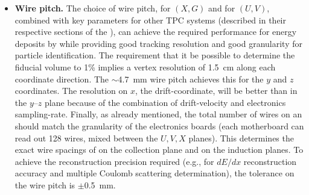 \begin{itemize}
\item \textbf{Wire pitch.} The choice of wire pitch, \xgpitch for $(X,G)$ and \uvpitch for $(U,V)$, combined with key parameters for other TPC systems (described in their respective sections of the ), can achieve the required performance for energy deposits by  while providing good tracking resolution and good granularity for particle identification. The \single requirement that it be possible to determine the fiducial volume to \num{1}\% implies a vertex resolution of \SI{1.5}{cm} along each coordinate direction. The $\sim$\SI{4.7}{mm} wire pitch achieves this for the $y$ and $z$ coordinates.  The resolution on $x$, the drift-coordinate, will be better than in the $y$--$z$ plane because of the combination of drift-velocity and electronics sampling-rate.  Finally, as already mentioned, the total number of wires on an  should match the granularity of the electronics boards (each  motherboard can read out \num{128} wires, mixed between the $U,V,X$ planes). This determines the exact wire spacings of \xgpitch on the collection plane and \uvpitch on the induction planes.  To achieve the reconstruction precision required (e.g., for $dE/dx$ reconstruction accuracy and multiple Coulomb scattering determination), the tolerance on the wire pitch is $\pm$\SI{0.5}{mm}.


\end{itemize}
